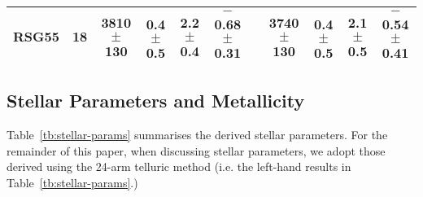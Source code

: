 \documentclass[iop]{emulateapj}
\def\pp{$\phantom{-}$}
\def\o{$\phantom{0}$}
\begin{document}
\begin{table*}
\begin{center}
\begin{tabular}{lc cccc c cccc}
RSG55 & 18& 3810 $\pm$ 130  & \pp0.4 $\pm$ 0.5 & 2.2 $\pm$ 0.4 & $-$0.68 $\pm$ 0.31 & & 3740 $\pm$ 130  & \pp0.4 $\pm$ 0.5 &  2.1 $\pm$ 0.5 & $-$0.54 $\pm$ 0.41 \\

  \hline
  \end{tabular}
  \end{center}
\end{table*}

\subsection{Stellar Parameters and Metallicity} %
\label{sub:stellar_parameters_and_metallicity}

Table~\ref{tb:stellar-params} summarises the derived stellar parameters.
For the remainder of this paper, when discussing stellar parameters,
we adopt those derived using the 24-arm telluric method (i.e. the left-hand results in Table~\ref{tb:stellar-params}.)
\end{document}

